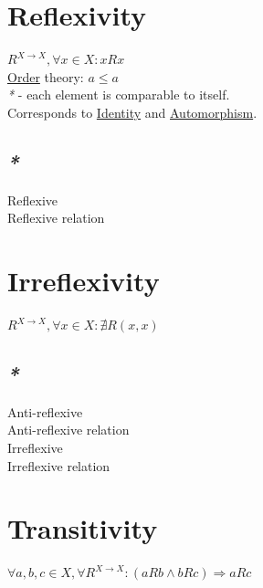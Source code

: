 \documentclass[a4paper,14pt,oneside]{book}
\begin{document}
\section{\label{org28c499e}Reflexivity}
\label{sec:org583cdd9}

\(R^{X \to X}, \forall x \in X : x R x\)\\
\hyperref[org1313c5f]{Order} theory: \(a \le a\)\\

\emph{*} - each element is comparable to itself.\\

Corresponds to \hyperref[org79eeec1]{Identity} and \hyperref[org6df4ca3]{Automorphism}.\\

\subsection{\emph{*}}
\label{sec:org388e1c3}

\label{org7d60c20}Reflexive\\
\label{orgb2340fc}Reflexive relation\\

\section{\label{org8c056b7}Irreflexivity}
\label{sec:org91b50ed}

\(R^{X \to X}, \forall x \in X : \nexists R(x, x)\)\\

\subsection{\emph{*}}
\label{sec:org0f80b24}

\label{org15beb39}Anti-reflexive\\
\label{org27889c8}Anti-reflexive relation\\
\label{orgd1f1ef1}Irreflexive\\
\label{org84a1a29}Irreflexive relation\\

\section{\label{org3fb2048}Transitivity}
\label{sec:org1adc935}

\(\forall a,b,c \in X, \forall R^{X \to X} : (aRb \land bRc) \Rightarrow aRc\)\\
\end{document}
